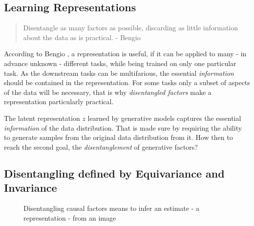 	\subsection{Learning Representations}

	\begin{quote}
		{Disentangle as many factors as possible, discarding as little information about the data as is practical.} - Bengio \etal \cite{bengio13rep} %
	\end{quote}

	According to Bengio \etal \cite{bengio13rep}, a representation is useful, if it can be applied to many - in advance unknown - different tasks, while being trained on only one particular task.
	As the downstream tasks can be multifarious, the essential \textit{information} should be contained in the representation.
	For some tasks only a subset of aspects of the data will be necessary, that is why \textit{disentangled factors} make a representation particularly practical.

	The latent representation $z$ learned by generative models captures the essential \textit{information} of the data distribution. That is made sure by requiring the ability to generate samples from the original data distribution from it.
	How then to reach the second goal, the \textit{disentanglement} of generative factors?

	\subsection{Disentangling defined by Equivariance and Invariance}
		\begin{figure}[htp]
			\centering
			
			\caption{Disentangling causal factors means to infer an estimate - \ie a representation - from an image}
			\label{fig:infer}
		\end{figure}

